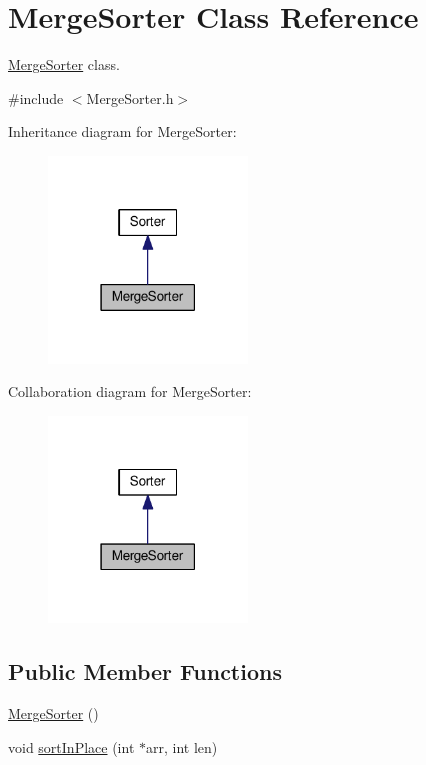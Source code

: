 \hypertarget{class_merge_sorter}{}\section{Merge\+Sorter Class Reference}
\label{class_merge_sorter}


\hyperlink{class_merge_sorter}{Merge\+Sorter} class.  




{\ttfamily \#include $<$Merge\+Sorter.\+h$>$}



Inheritance diagram for Merge\+Sorter\+:
\nopagebreak
\begin{figure}[H]
\begin{center}
\leavevmode
\includegraphics[width=150pt]{class_merge_sorter__inherit__graph}
\end{center}
\end{figure}


Collaboration diagram for Merge\+Sorter\+:
\nopagebreak
\begin{figure}[H]
\begin{center}
\leavevmode
\includegraphics[width=150pt]{class_merge_sorter__coll__graph}
\end{center}
\end{figure}
\subsection*{Public Member Functions}
\begin{DoxyCompactItemize}
\item 
\hyperlink{class_merge_sorter_a6a1d4829efdea1e94f9ed2f61d32022c}{Merge\+Sorter} ()
\item 
void \hyperlink{class_merge_sorter_a1137eeb25786449a1363bac71f81014d}{sort\+In\+Place} (int $\ast$arr, int len)
\end{DoxyCompactItemize}
